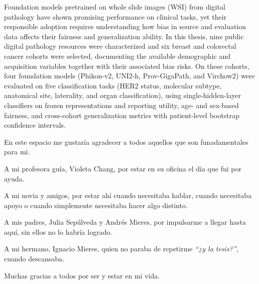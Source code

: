 \documentclass[dosguias,openany]{tesisusach}
\begin{document}
	\begin{resumenEn}
		Foundation models pretrained on whole slide images (WSI) from digital pathology have shown promising performance on clinical tasks, yet their responsible adoption requires understanding how bias in source and evaluation data affects their fairness and generalization ability. In this thesis, nine public digital pathology resources were characterized and six breast and colorectal cancer cohorts were selected, documenting the available demographic and acquisition variables together with their associated bias risks. On these cohorts, four foundation models (Phikon-v2, UNI2-h, Prov-GigaPath, and Virchow2) were evaluated on five classification tasks (HER2 status, molecular subtype, anatomical site, laterality, and organ classification), using single-hidden-layer classifiers on frozen representations and reporting utility, age- and sex-based fairness, and cross-cohort generalization metrics with patient-level bootstrap confidence intervals.
	\end{resumenEn}

	
	\begin{agradecimiento}
		En este espacio me gustaría agradecer a todos aquellos que son funadamentales para mi.

		A mi profesora guía, Violeta Chang, por estar en su oficina el día que fui por ayuda.
		
		A mi novia y amigos, por estar ahí cuando necesitaba hablar, cuando necesitaba apoyo o cuando simplemente necesitaba hacer algo distinto.

		A mis padres, Julia Sepúlveda y Andrés Mieres, por impulsarme a llegar hasta aquí, sin ellos no lo habría logrado.

		A mi hermano, Ignacio Mieres, quien no paraba de repetirme \textit{``¿y la tesis?''}, cuando descansaba.

		Muchas gracias a todos por ser y estar en mi vida.
	\end{agradecimiento}

	\tableofcontents
	\newpage
	\listoftables
	\newpage
	\listoffigures
	\newpage
\end{document}
